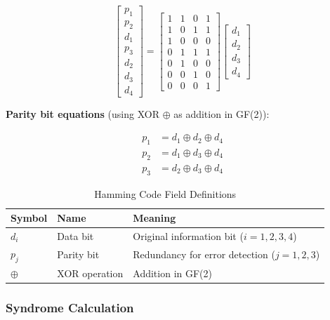 \documentclass[11pt,a4paper]{article}
\begin{document}
\begin{equation}
\begin{bmatrix} p_1 \\ p_2 \\ d_1 \\ p_3 \\ d_2 \\ d_3 \\ d_4 \end{bmatrix} =
\begin{bmatrix}
1 & 1 & 0 & 1 \\
1 & 0 & 1 & 1 \\
1 & 0 & 0 & 0 \\
0 & 1 & 1 & 1 \\
0 & 1 & 0 & 0 \\
0 & 0 & 1 & 0 \\
0 & 0 & 0 & 1
\end{bmatrix}
\begin{bmatrix} d_1 \\ d_2 \\ d_3 \\ d_4 \end{bmatrix}
\end{equation}

\textbf{Parity bit equations} (using XOR $\oplus$ as addition in GF(2)):

\begin{align}
p_1 &= d_1 \oplus d_2 \oplus d_4 \\
p_2 &= d_1 \oplus d_3 \oplus d_4 \\
p_3 &= d_2 \oplus d_3 \oplus d_4
\end{align}

\begin{table}[htbp]
\centering
\caption{Hamming Code Field Definitions}
\begin{tabular}{@{}lll@{}}
\toprule
\textbf{Symbol} & \textbf{Name} & \textbf{Meaning} \\ \midrule
$d_i$ & Data bit & Original information bit ($i = 1,2,3,4$) \\
$p_j$ & Parity bit & Redundancy for error detection ($j = 1,2,3$) \\
$\oplus$ & XOR operation & Addition in GF(2) \\ \bottomrule
\end{tabular}
\end{table}

\subsubsection{Syndrome Calculation}
\end{document}
